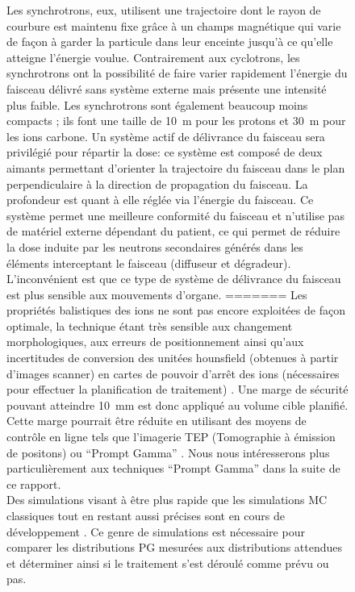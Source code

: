 \documentclass[11pt,a4paper,oldfontcommands]{memoir}
\begin{document}
\begin{figure}
Les synchrotrons, eux, utilisent une trajectoire dont le rayon de courbure est maintenu fixe grâce à un champs magnétique qui varie de façon à garder la particule dans leur enceinte jusqu'à ce qu'elle atteigne l'énergie voulue. Contrairement aux cyclotrons, les synchrotrons ont la possibilité de faire varier rapidement l'énergie du faisceau délivré sans système externe mais présente une intensité plus faible. Les synchrotrons sont également beaucoup moins compacts ; ils font une taille de 10~m pour les protons et 30~m pour les ions carbone. Un système actif de délivrance du faisceau sera privilégié pour répartir la dose: ce système est composé de deux aimants permettant d'orienter la trajectoire du faisceau dans le plan perpendiculaire à la direction de propagation du faisceau. La profondeur est quant à elle réglée via l'énergie du faisceau. Ce système permet une meilleure conformité du faisceau et n'utilise pas de matériel externe dépendant du patient, ce qui permet de réduire la dose induite par les neutrons secondaires générés dans les éléments interceptant le faisceau (diffuseur et dégradeur). L'inconvénient est que ce type de système de délivrance du faisceau est plus sensible aux mouvements d'organe. 
=======
Les propriétés balistiques des ions ne sont pas encore exploitées de façon optimale, la technique étant très sensible aux changement morphologiques, aux erreurs de positionnement ainsi qu'aux incertitudes de conversion des unitées hounsfield (obtenues à partir d'images scanner) en cartes de pouvoir d'arrêt des ions (nécessaires pour effectuer la planification de traitement) \cite{Paganetti2012}. Une marge de sécurité pouvant atteindre 10~mm est donc appliqué au volume cible planifié. Cette marge pourrait être réduite en utilisant des moyens de contrôle en ligne tels que l'imagerie TEP (Tomographie à émission de positons) \cite{Parodi2018} ou \enquote{Prompt Gamma} \cite{Krimmer2017a}. Nous nous intéresserons plus particulièrement aux techniques \enquote{Prompt Gamma} dans la suite de ce rapport. \\
Des simulations visant à être plus rapide que les simulations MC classiques tout en restant aussi précises sont en cours de développement \cite{Huisman_2016}\cite{Embriaco_2018}\cite{Sterpin_2015}. Ce genre de simulations est nécessaire pour comparer les distributions PG mesurées aux distributions attendues et déterminer ainsi si le traitement s'est déroulé comme prévu ou pas.


\end{figure}
\end{document}
